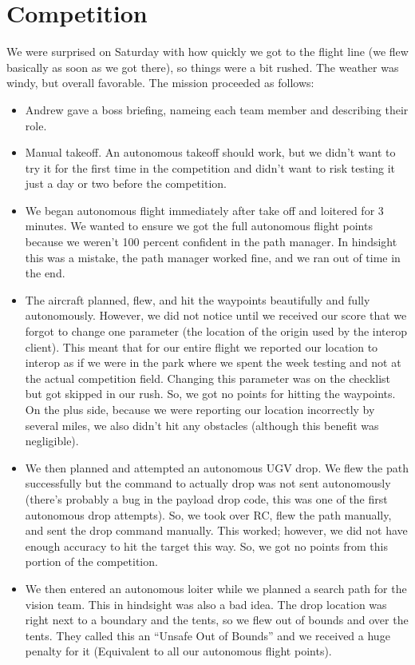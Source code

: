 \documentclass[]{auvsi_doc}
\begin{document}
\section{Competition}
We were surprised on Saturday with how quickly we got to the flight line (we flew basically as soon as we got there), so things were a bit rushed. The weather was windy, but overall favorable. The mission proceeded as follows:
\begin{itemize}
	\item    Andrew gave a boss briefing, nameing each team member and describing their role.
	\item    Manual takeoff. An autonomous takeoff should work, but we didn’t want to try it for the first time in the competition and didn't want to risk testing it just a day or two before the competition.
	\item    We began autonomous flight immediately after take off and loitered for 3 minutes. We wanted to ensure we got the full autonomous flight points because we weren’t 100 percent confident in the path manager. In hindsight this was a mistake, the path manager worked fine, and we ran out of time in the end.
	\item    The aircraft planned, flew, and hit the waypoints beautifully and fully autonomously. However, we did not notice until we received our score that we forgot to change one parameter (the location of the origin used by the interop client). This meant that for our entire flight we reported our location to interop as if we were in the park where we spent the week testing and not at the actual competition field. Changing this parameter was on the checklist but got skipped in our rush. So, we got no points for hitting the waypoints. On the plus side, because we were reporting our location incorrectly by several miles, we also didn’t hit any obstacles (although this benefit was negligible).
	\item    We then planned and attempted an autonomous UGV drop. We flew the path successfully but the command to actually drop was not sent autonomously (there's probably a bug in the payload drop code, this was one of the first autonomous drop attempts). So, we took over RC, flew the path manually, and sent the drop command manually. This worked; however, we did not have enough accuracy to hit the target this way. So, we got no points from this portion of the competition.
	\item    We then entered an autonomous loiter while we planned a search path for the vision team. This in hindsight was also a bad idea. The drop location was right next to a boundary and the tents, so we flew out of bounds and over the tents. They called this an “Unsafe Out of Bounds” and we received a huge penalty for it (Equivalent to all our autonomous flight points).

\end{itemize}
\end{document}
